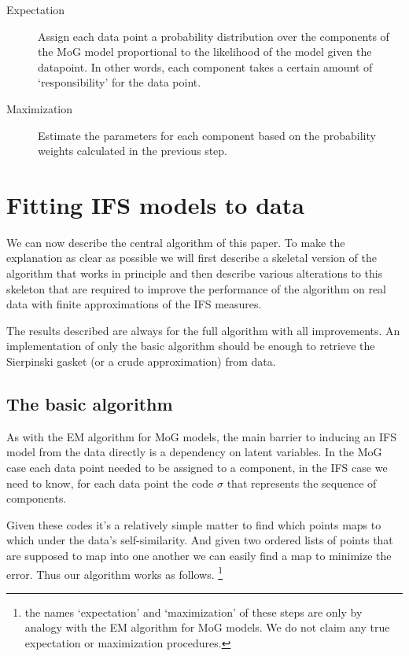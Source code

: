 \documentclass[10pt,a4paper,oneside]{article}
\theoremstyle{definition}
\begin{document}
\begin{description}
  \item[Expectation] Assign each data point a probability distribution over the components of the MoG model proportional to the likelihood of the model given the datapoint. In other words, each component takes a certain amount of `responsibility' for the data point.
  \item[Maximization] Estimate the parameters for each component based on the probability weights calculated in the previous step.
\end{description} 

\section*{Fitting IFS models to data}

We can now describe the central algorithm of this paper. To make the explanation as clear as possible we will first describe a skeletal version of the algorithm that works in principle and then describe various alterations to this skeleton that are required to improve the performance of the algorithm on real data with finite approximations of the IFS measures. 

The results described are always for the full algorithm with all improvements. An implementation of only the basic algorithm should be enough to retrieve the Sierpinski gasket (or a crude approximation) from data.

\subsection*{The basic algorithm}

As with the EM algorithm for MoG models, the main barrier to inducing an IFS model from the data directly is a dependency on latent variables. In the MoG case each data point needed to be assigned to a component, in the IFS case we need to know, for each data point the code $\sigma$ that represents the sequence of components. 

Given these codes it's a relatively simple matter to find which points maps to which under the data's self-similarity. And given two ordered lists of points that are supposed to map into one another we can easily find a map to minimize the error. Thus our algorithm works as follows. 
\footnote{the names `expectation' and `maximization' of these steps are only by analogy with the EM algorithm for MoG models. We do not claim any true expectation or maximization procedures.}
\end{document}
